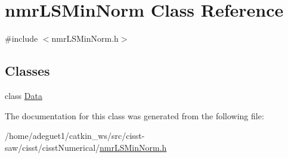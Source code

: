 \hypertarget{classnmr_l_s_min_norm}{\section{nmr\-L\-S\-Min\-Norm Class Reference}
\label{classnmr_l_s_min_norm}
}


{\ttfamily \#include $<$nmr\-L\-S\-Min\-Norm.\-h$>$}

\subsection*{Classes}
\begin{DoxyCompactItemize}
\item 
class \hyperlink{classnmr_l_s_min_norm_1_1_data}{Data}
\end{DoxyCompactItemize}


The documentation for this class was generated from the following file\-:\begin{DoxyCompactItemize}
\item 
/home/adeguet1/catkin\-\_\-ws/src/cisst-\/saw/cisst/cisst\-Numerical/\hyperlink{nmr_l_s_min_norm_8h}{nmr\-L\-S\-Min\-Norm.\-h}\end{DoxyCompactItemize}
